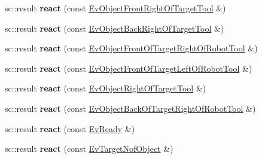 \begin{DoxyCompactItemize}
\item 
\mbox{\label{structManipulate_ac3ca97a6703e28d163c2971c932c44bb}} 
sc\+::result {\bfseries react} (const \hyperlink{structEvObjectFrontRightOfTargetTool}{Ev\+Object\+Front\+Right\+Of\+Target\+Tool} \&)
\item 
\mbox{\label{structManipulate_a2efcf809cb1959ebd5c9954f57ee4df9}} 
sc\+::result {\bfseries react} (const \hyperlink{structEvObjectBackRightOfTargetTool}{Ev\+Object\+Back\+Right\+Of\+Target\+Tool} \&)
\item 
\mbox{\label{structManipulate_a706d6ae92be6622f241ae4efb14ae2ff}} 
sc\+::result {\bfseries react} (const \hyperlink{structEvObjectFrontOfTargetRightOfRobotTool}{Ev\+Object\+Front\+Of\+Target\+Right\+Of\+Robot\+Tool} \&)
\item 
\mbox{\label{structManipulate_ae75ffd2328a4ec52514c32d741f0158a}} 
sc\+::result {\bfseries react} (const \hyperlink{structEvObjectFrontOfTargetLeftOfRobotTool}{Ev\+Object\+Front\+Of\+Target\+Left\+Of\+Robot\+Tool} \&)
\item 
\mbox{\label{structManipulate_a68fa3d1012e40d8879e97d4802623d2f}} 
sc\+::result {\bfseries react} (const \hyperlink{structEvObjectRightOfTargetTool}{Ev\+Object\+Right\+Of\+Target\+Tool} \&)
\item 
\mbox{\label{structManipulate_a6e5275c131e29c4b522d7dadfd188301}} 
sc\+::result {\bfseries react} (const \hyperlink{structEvObjectBackOfTargetRightOfRobotTool}{Ev\+Object\+Back\+Of\+Target\+Right\+Of\+Robot\+Tool} \&)
\item 
\mbox{\label{structManipulate_a632a7fc704db441217fa508b41d237aa}} 
sc\+::result {\bfseries react} (const \hyperlink{structEvReady}{Ev\+Ready} \&)
\item 
\mbox{\label{structManipulate_a0e2ca7e2da3fb96aa8c4da62bbf2a08c}} 
sc\+::result {\bfseries react} (const \hyperlink{structEvTargetNofObject}{Ev\+Target\+Nof\+Object} \&)
\item 
\mbox{\label{structManipulate_a9a086a05e793f9e97dcdb06f7b959c1b}} 

\end{DoxyCompactItemize}
